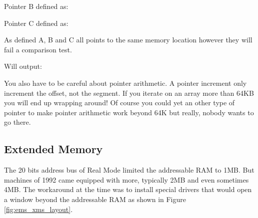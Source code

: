 \documentclass[book.tex]{subfiles}
\begin{document}
\bigskip

Pointer B defined as:\\
\par
\begin{minipage}{\textwidth}

\end{minipage}

\bigskip

Pointer C defined as:\\
\par
\begin{minipage}{\textwidth}

\end{minipage}

As defined A, B and C all points to the same memory location however they will fail a comparison test.\\

\begin{minipage}{\textwidth}

\end{minipage}
\par
Will output:\\

\begin{minipage}{\textwidth}

\end{minipage}
\par

You also have to be careful about pointer arithmetic. A  pointer increment only increment the offset, not the segment. If you iterate on an array more than 64KB you will end up wrapping around! Of course you could yet an other type of pointer  to make pointer arithmetic work beyond 64K but really, nobody wants to go there.




  \subsection{Extended Memory}

The 20 bits address bus of Real Mode limited the addressable RAM to 1MB. But machines of 1992 came equipped with more, typically 2MB and even sometimes 4MB. The workaround at the time was to install special drivers that would open a window beyond the addressable RAM as shown in Figure \ref{fig:ems_xms_layout}.
\end{document}
